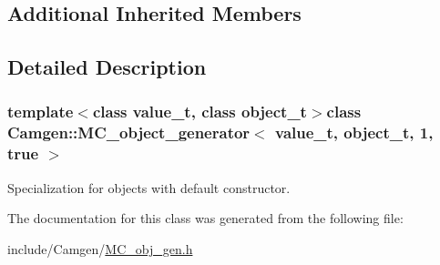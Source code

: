 \subsection*{Additional Inherited Members}


\subsection{Detailed Description}
\subsubsection*{template$<$class value\-\_\-t, class object\-\_\-t$>$class Camgen\-::\-M\-C\-\_\-object\-\_\-generator$<$ value\-\_\-t, object\-\_\-t, 1, true $>$}

Specialization for objects with default constructor. 

The documentation for this class was generated from the following file\-:\begin{DoxyCompactItemize}
\item 
include/\-Camgen/\hyperlink{a00673}{M\-C\-\_\-obj\-\_\-gen.\-h}\end{DoxyCompactItemize}

